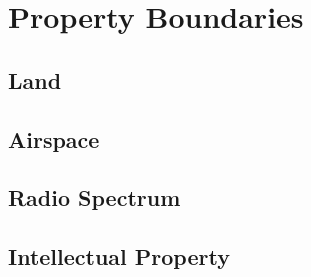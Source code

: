 \chapter{Property Boundaries}




\section{Land}



\begin{questions}

\end{questions}

\section{Airspace}



\begin{questions}

\end{questions}

\section{Radio Spectrum}



\begin{questions}

\end{questions}

\section{Intellectual Property}





\begin{questions}

\end{questions}

